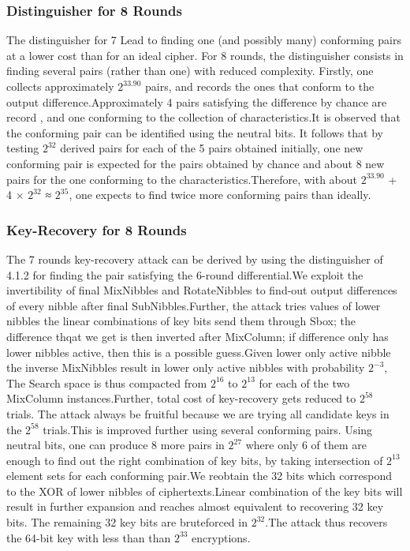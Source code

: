 \documentclass[preprint]{transcrypto}
\begin{document}
\subsubsection{Distinguisher for 8 Rounds}
The distinguisher for 7 Lead to finding one (and possibly many) conforming pairs at a lower cost than for an ideal cipher. For 8 rounds, the distinguisher consists in finding several pairs (rather than one) with reduced complexity. Firstly, one collects approximately $2^{33.90}$ pairs, and records the ones that conform to the output difference.Approximately 4 pairs satisfying the difference by chance are record , and one conforming to the collection of characteristics.It is observed that the conforming pair can be identified using the neutral bits. It follows that by testing $2^{32}$ derived pairs for each of the 5 pairs obtained initially, one new conforming pair is expected for the pairs obtained by chance and about 8 new pairs for the one conforming to the characteristics.Therefore, with about $2^{33.90}$ + 4 × $2^{32}$ ≈ $2^{35}$, one expects to find twice more conforming pairs than ideally.\\

\subsubsection{Key-Recovery for 8 Rounds}
The 7 rounds key-recovery attack can be derived by using the distinguisher of 4.1.2 for
finding the pair satisfying the 6-round differential.We exploit the invertibility of final MixNibbles and RotateNibbles to find-out output differences of every nibble after final SubNibbles.Further, the attack tries values of lower nibbles the linear combinations of key bits send them through Sbox; the difference thqat we get is then inverted after MixColumn; if difference only has lower nibbles active, then this is a possible guess.Given lower only active nibble the inverse MixNibbles result in lower only active nibbles with probability $2^{−3}$, The Search space is thus compacted from $2^{16}$
to $2^{13}$ for each of the two MixColumn instances.Further, total cost of key-recovery gets reduced to $2^{58}$ trials. The attack always be fruitful because we are trying all candidate keys in the $2^{58}$ trials.This is improved further using several conforming pairs. Using neutral
bits, one can produce 8 more pairs in $2^27$ where only 6 of them are enough to
find out the right combination of key bits, by taking intersection of $2^{13}$ element sets for each conforming pair.We reobtain the 32 bits which correspond to the XOR of lower nibbles of ciphertexts.Linear combination of the key bits will result in further expansion and reaches almost equivalent to recovering 32 key bits. The remaining 32 key bits are bruteforced in $2^32$.The attack thus recovers the 64-bit key with less than than $2^{33}$ encryptions.\\
\end{document}
